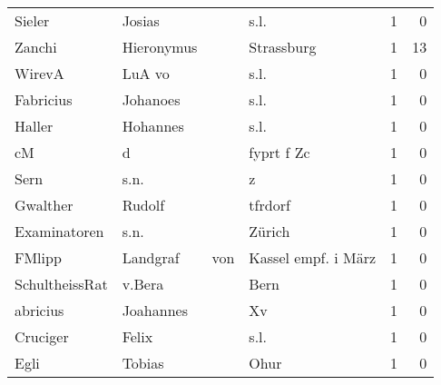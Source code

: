 \begin{tabular}{llllrr}
                   Sieler &                             Josias &             &                                        s.l. &          1 &         0 \\
                   Zanchi &                         Hieronymus &             &                                  Strassburg &          1 &        13 \\
                   WirevA &                             LuA vo &             &                                        s.l. &          1 &         0 \\
                Fabricius &                           Johanoes &             &                                        s.l. &          1 &         0 \\
                   Haller &                           Hohannes &             &                                        s.l. &          1 &         0 \\
                       cM &                                  d &             &                                  fyprt f Zc &          1 &         0 \\
                     Sern &                               s.n. &             &                                           z &          1 &         0 \\
                 Gwalther &                             Rudolf &             &                                     tfrdorf &          1 &         0 \\
             Examinatoren &                               s.n. &             &                                      Zürich &          1 &         0 \\
                   FMlipp &                           Landgraf &         von &                         Kassel empf. i März &          1 &         0 \\
           SchultheissRat &                             v.Bera &             &                                        Bern &          1 &         0 \\
                 abricius &                          Joahannes &             &                                          Xv &          1 &         0 \\
                 Cruciger &                              Felix &             &                                        s.l. &          1 &         0 \\
                     Egli &                             Tobias &             &                                        Ohur &          1 &         0 \\

\end{tabular}
